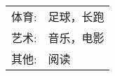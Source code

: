 %
%



\begin{tabular}{rl}
    \textsc{体育:} & 足球，长跑 \\
    \textsc{艺术:} & 音乐，电影 \\ 
    \textsc{其他:} & 阅读\\
\end{tabular}